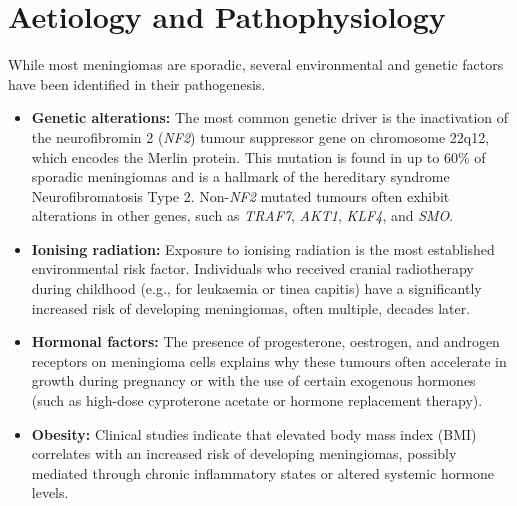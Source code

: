 \section*{Aetiology and Pathophysiology}
While most meningiomas are sporadic, several environmental and genetic factors have been identified in their pathogenesis.
\begin{itemize}
    \item \textbf{Genetic alterations:} The most common genetic driver is the inactivation of the neurofibromin 2 (\textit{NF2}) tumour suppressor gene on chromosome 22q12, which encodes the Merlin protein. This mutation is found in up to 60\% of sporadic meningiomas and is a hallmark of the hereditary syndrome Neurofibromatosis Type 2. Non-\textit{NF2} mutated tumours often exhibit alterations in other genes, such as \textit{TRAF7}, \textit{AKT1}, \textit{KLF4}, and \textit{SMO}.
    \item \textbf{Ionising radiation:} Exposure to ionising radiation is the most established environmental risk factor. Individuals who received cranial radiotherapy during childhood (e.g., for leukaemia or tinea capitis) have a significantly increased risk of developing meningiomas, often multiple, decades later.
    \item \textbf{Hormonal factors:} The presence of progesterone, oestrogen, and androgen receptors on meningioma cells explains why these tumours often accelerate in growth during pregnancy or with the use of certain exogenous hormones (such as high-dose cyproterone acetate or hormone replacement therapy).
    \item \textbf{Obesity:} Clinical studies indicate that elevated body mass index (BMI) correlates with an increased risk of developing meningiomas, possibly mediated through chronic inflammatory states or altered systemic hormone levels.
\end{itemize}

